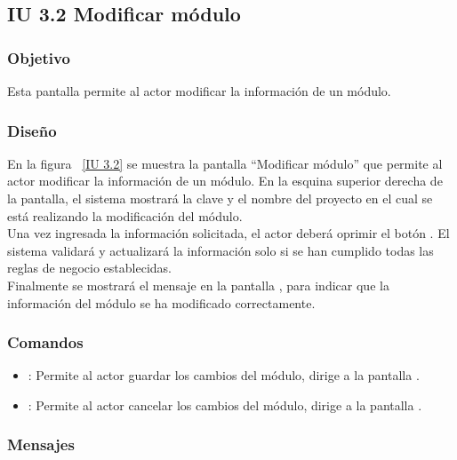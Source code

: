 \newpage 
\subsection{IU 3.2 Modificar módulo}

\subsubsection{Objetivo}
	
    Esta pantalla permite al actor modificar la información de un módulo.

\subsubsection{Diseño}

    En la figura ~\ref{IU 3.2} se muestra la pantalla ``Modificar módulo'' que permite al actor modificar la información de un módulo. En la esquina superior derecha de la pantalla, el sistema mostrará la clave y el nombre del proyecto en el cual se está realizando la modificación del módulo.\\

    
    Una vez ingresada la información solicitada, el actor deberá oprimir el botón . El sistema validará y actualizará la 
    información solo si se han cumplido todas las reglas de negocio establecidas.  \\
    
    Finalmente se mostrará el mensaje  en la pantalla , 
    para indicar que la información del módulo
    se ha modificado correctamente.        



\subsubsection{Comandos}
\begin{itemize}
	\item {}: Permite al actor guardar los cambios del módulo, dirige a la pantalla .
	\item {}: Permite al actor cancelar los cambios del módulo, dirige a la pantalla .
\end{itemize}

\subsubsection{Mensajes}
	
